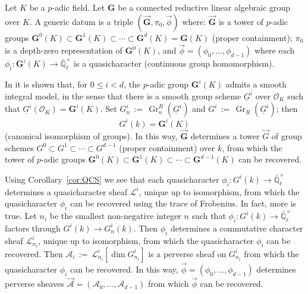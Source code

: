 \documentclass[10pt]{amsart}
\theoremstyle{plain}
\theoremstyle{definition}
\newcommand{\EE}{\mathbb{\bar Q}_\ell}
\newcommand{\OK}{\mathcal{O}_K}
\newcommand{\Fq}{k}
\newcommand{\EEx}{\EE^\times}
\newcommand{\G}{\textbf{G}}
\DeclareMathOperator{\Gr}{Gr}
\newcommand{\ceq}{{\, :=\, }}
\newcommand{\cs}[1]{{\mathcal{#1}}}
\begin{document}
\iffalse

Let $K$ be a $p$-adic field. Let $\G$ be a connected reductive linear algebraic group over $K$. 
A generic datum is a triple $(\vec{\G}, \pi_0, \vec{\phi})$ where: $\vec{\G}$ is a tower of $p$-adic groups $\G^0(K) \subset \G^1(K) \subset \cdots  \subset \G^d(K) = \G(K)$ (proper containment); $\pi_0$ is a depth-zero representation of $\G^0(K)$, and $\vec{\phi} = (\phi_0, \ldots , \phi_{d-1})$ where each $\phi_i : \G^i(K) \to \EEx$ is a quasicharacter (continuous group homomorphism).  


In \cite{yu:03a} it is shown that, for $0 \leq i < d$, the $p$-adic group $\G^i(K)$ admits a smooth integral model, in the sense that there is  a smooth group scheme $\underline{G}^i$ over $\OK$ such that $\underline{G}^i(\OK) = \G^i(K)$.
Set $G^i_n \ceq \Gr^R_n(\underline{G}^i)$ and $G^i \ceq \Gr_R(\underline{G}^i)$; 
then \[G^i(\Fq) = \G^i(K)\] (canonical isomorphism of groups).
In this way, $\vec{\G}$ determines a tower $\vec{G}$ of group schemes $G^0 \subset G^1 \subset \cdots  \subset G^{d-1}$ (proper containment) over $\Fq$, from which the tower of $p$-adic groups
$\G^0(K) \subset \G^1(K) \subset \cdots  \subset \G^{d-1}(K)$ can be recovered.

Using Corollary~\ref{cor:QCS}  we see that each quasicharacter $\phi_i : G^i(\Fq) \to \EEx$ determines a quasicharacter sheaf $\cs{L}^i$, unique up to isomorphism, from which the quasicharacter $\phi_i$ can be recovered using the trace of Frobenius. 
In fact, more is true. Let $n_i$ be the smallest non-negative integer $n$ such that $\phi_i : G^i(\Fq) \to \EEx$ factors through $G^i(\Fq) \to G^i_n(\Fq)$.
Then $\phi_i$ determines a commutative character sheaf $\cs{L}_{n_i}^i$, unique up to isomorphism, from which the quasicharacter $\phi_i$ can be recovered.
Then $\cs{A}_i\ceq \cs{L}_{n_i}^i[\dim G_{n_i}^i]$ is a perverse sheaf on $G_{n_i}^i$ from which the quasicharacter $\phi_i$ can be recovered.
In this way,  $\vec{\phi} = (\phi_0, \ldots , \phi_{d-1})$ determines perverse sheaves $\vec{\cs{A}} = (\cs{A}_0, \ldots , \cs{A}_{d-1})$ from which $\vec{\phi}$ can be recovered. 
\end{document}
